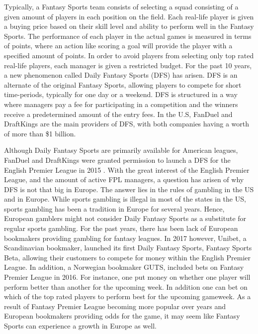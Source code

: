 \newpar
Typically, a Fantasy Sports team consists of selecting a squad consisting of a given amount of players in each position on the field. Each real-life player is given a buying price based on their skill level and ability to perform well in the Fantasy Sports. The performance of each player in the actual games is measured in terms of points, where an action like scoring a goal will provide the player with a specified amount of points. In order to avoid players from selecting only top rated real-life players, each manager is given a restricted budget.
\newpar
For the past 10 years, a new phenomenon called Daily Fantasy Sports (DFS) has arisen. DFS is an alternate of the original Fantasy Sports, allowing players to compete for short time-periods, typically for one day or a weekend. DFS is structured in a way where managers pay a fee for participating in a competition and the winners receive a predetermined amount of the entry fees. In the U.S, FanDuel and DraftKings are the main providers of DFS, with both companies having a worth of more than \$1 billion.

\newpar
Although Daily Fantasy Sports are primarily available for American leagues, FanDuel and DraftKings were granted permission to launch a DFS for the English Premier League in 2015 \citep{Purdum}. With the great interest of the English Premier League, and the amount of active FPL managers, a question has arisen of why DFS is not that big in Europe. The answer lies in the rules of gambling in the US and in Europe. While sports gambling is illegal in most of the states in the US, sports gambling has been a tradition in Europe for several years. Hence, European gamblers might not consider Daily Fantasy Sports as a substitute for regular sports gambling.  
\newpar
For the past years, there has been lack of European bookmakers providing gambling for fantasy leagues. In 2017 however, Unibet, a Scandinavian bookmaker, launched its first Daily Fantasy Sports, Fantasy Sports Beta, allowing their customers to compete for money within the English Premier League. In addition, a Norwegian bookmaker GUTS, included bets on Fantasy Premier League in 2016. For instance, one put money on whether one player will perform better than another for the upcoming week. In addition one can bet on which of the top rated players to perform best for the upcoming gameweek. As a result of Fantasy Premier League becoming more popular over years and European bookmakers providing odds for the game, it may seem like Fantasy Sports can experience a growth in Europe as well. 

